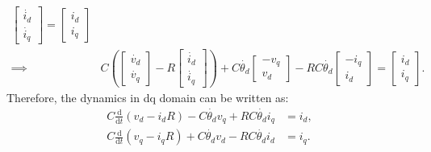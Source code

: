 \begin{align*}
\begin{bmatrix}
		\dot{i_d}\\\dot{i_q}
	\end{bmatrix} = \begin{bmatrix}
		i_d\\i_q
	\end{bmatrix}\\
	\implies & C\left(\begin{bmatrix}
		\dot{v_d}\\\dot{v_q}
	\end{bmatrix}-R\begin{bmatrix}
		\dot{i_d}\\\dot{i_q}
	\end{bmatrix}\right)+C\dot{\theta_d}\begin{bmatrix}
		-v_q\\v_d
	\end{bmatrix}-RC\dot{\theta_d}\begin{bmatrix}
		-i_q\\i_d
	\end{bmatrix} = \begin{bmatrix}
		i_d\\i_q
	\end{bmatrix}.
\end{align*}
Therefore, the dynamics in dq domain can be written as:
\begin{align*}
	C\frac{\text{d}}{\text{d}t}\left(v_d-i_dR\right)-C\dot{\theta_d}v_q+RC\dot{\theta_d}i_q &= i_d,\\
	C\frac{\text{d}}{\text{d}t}\left(v_q-i_qR\right)+C\dot{\theta_d}v_d-RC\dot{\theta_d}i_d &= i_q.
\end{align*}
